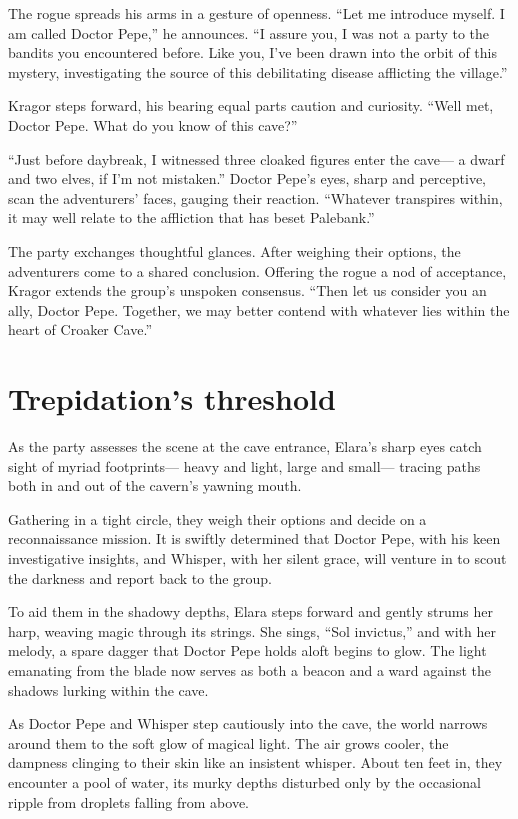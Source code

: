 \documentclass[
  letterpaper,12pt,twoside,twocolumn,openany,
  nodeprecatedcode,bg=full]{dndbook}
\begin{document}
The rogue spreads his arms in a gesture of openness. ``Let me introduce
myself. I am called Doctor Pepe,'' he announces. ``I assure you, I was
not a party to the bandits you encountered before. Like you, I've been
drawn into the orbit of this mystery, investigating the source of this
debilitating disease afflicting the village.''

Kragor steps forward, his bearing equal parts caution and curiosity.
``Well met, Doctor Pepe. What do you know of this cave?''

``Just before daybreak, I witnessed three cloaked figures enter the
cave--- a dwarf and two elves, if I'm not mistaken.'' Doctor Pepe's
eyes, sharp and perceptive, scan the adventurers' faces, gauging their
reaction. ``Whatever transpires within, it may well relate to the
affliction that has beset Palebank.''

The party exchanges thoughtful glances. After weighing their options,
the adventurers come to a shared conclusion. Offering the rogue a nod of
acceptance, Kragor extends the group's unspoken consensus. ``Then let us
consider you an ally, Doctor Pepe. Together, we may better contend with
whatever lies within the heart of Croaker Cave.''

\section{Trepidation's threshold}\label{trepidations-threshold}

As the party assesses the scene at the cave entrance, Elara's sharp eyes
catch sight of myriad footprints--- heavy and light, large and small---
tracing paths both in and out of the cavern's yawning mouth.

Gathering in a tight circle, they weigh their options and decide on a
reconnaissance mission. It is swiftly determined that Doctor Pepe, with
his keen investigative insights, and Whisper, with her silent grace,
will venture in to scout the darkness and report back to the group.

To aid them in the shadowy depths, Elara steps forward and gently strums
her harp, weaving magic through its strings. She sings, ``Sol
invictus,'' and with her melody, a spare dagger that Doctor Pepe holds
aloft begins to glow. The light emanating from the blade now serves as
both a beacon and a ward against the shadows lurking within the cave.

As Doctor Pepe and Whisper step cautiously into the cave, the world
narrows around them to the soft glow of magical light. The air grows
cooler, the dampness clinging to their skin like an insistent whisper.
About ten feet in, they encounter a pool of water, its murky depths
disturbed only by the occasional ripple from droplets falling from
above.
\end{document}
